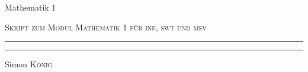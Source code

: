 \documentclass[a4paper, oneside]{report}
\begin{document}
\thispagestyle{empty}
\begin{center}

  \vspace*{12em}

  {\Huge Mathematik 1}\\

  {\large\vspace{1em}\scshape\color{gray}Skript zum Modul Mathematik 1 für inf, swt und msv
  \color{accent}\rule{0.7\textwidth}{0.7pt}
  }


    \vfill


  {\tiny\color{darkgray}\rule{0.3\textwidth}{0.5pt}
  \vspace{0.5em}

  \normalsize Simon \textsc{König}}
\end{center}

\tableofcontents



\end{document}
